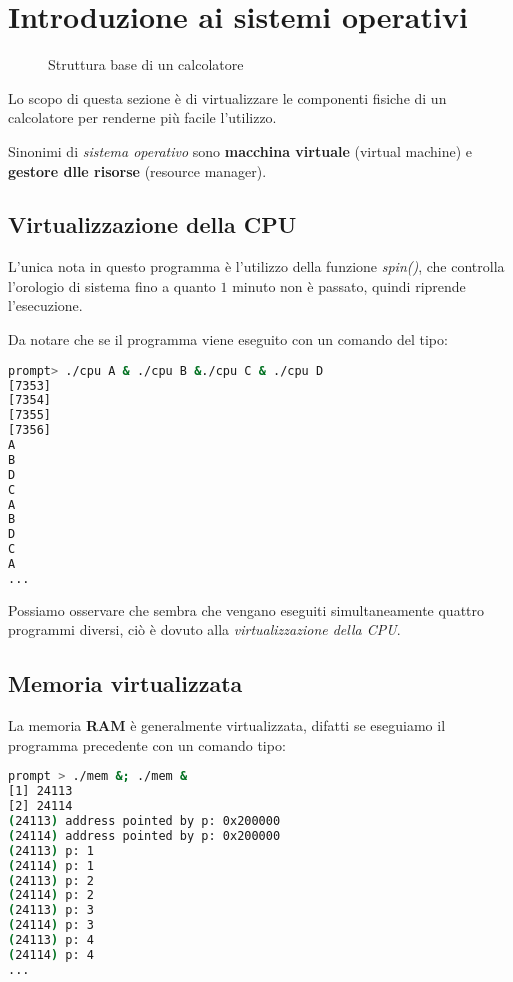 \chapter{Introduzione ai sistemi operativi}
\begin{figure}[ht]
  \centering
  \caption{Struttura base di un calcolatore}
  \label{fig:struttura}
\end{figure}

Lo scopo di questa sezione è di virtualizzare le componenti fisiche di un
calcolatore per renderne più facile l'utilizzo.

Sinonimi di \emph{sistema operativo} sono \textbf{macchina virtuale} (virtual
machine) e \textbf{gestore dlle risorse} (resource manager).

\section{Virtualizzazione della CPU}
L'unica nota in questo programma è l'utilizzo della funzione \emph{spin()}, che
controlla l'orologio di sistema fino a quanto $1$ minuto non è passato, quindi
riprende l'esecuzione.



Da notare che se il programma viene eseguito con un comando del tipo:
\begin{lstlisting}[language=bash,caption=Esecuzione in concorrenza]
prompt> ./cpu A & ./cpu B &./cpu C & ./cpu D
[7353]
[7354]
[7355]
[7356]
A
B
D
C
A
B
D
C
A
...
\end{lstlisting}

Possiamo osservare che sembra che vengano eseguiti simultaneamente quattro
programmi diversi, ciò è dovuto alla \emph{virtualizzazione della CPU}.

\section{Memoria virtualizzata}


La memoria \textbf{RAM} è generalmente virtualizzata, difatti se eseguiamo
il programma precedente con un comando tipo:
\begin{lstlisting}[language=bash,caption=Esecuzione in concorrenza]
prompt > ./mem &; ./mem &
[1] 24113
[2] 24114
(24113) address pointed by p: 0x200000
(24114) address pointed by p: 0x200000
(24113) p: 1
(24114) p: 1
(24113) p: 2
(24114) p: 2
(24113) p: 3
(24114) p: 3
(24113) p: 4
(24114) p: 4
...
\end{lstlisting}

